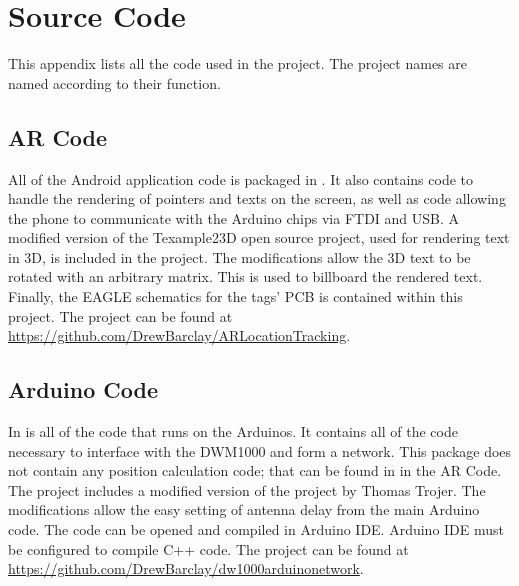 
\chapter{Source Code} %
\label{SourceCode} %

This appendix lists all the code used in the project. The project names are named according to their function.

\section{AR Code}
All of the Android application code is packaged in . It also contains code to handle the rendering
of pointers and texts on the screen, as well as code allowing the phone to communicate
with the Arduino chips via FTDI and USB. A modified version of the Texample23D open source project, used for rendering text in 3D, is included in the project. The modifications allow the 3D text to be rotated with an arbitrary matrix. This is used to billboard the rendered text. Finally, the EAGLE schematics for the tags' PCB is contained within this project. The project can be found at \url{https://github.com/DrewBarclay/ARLocationTracking}.

\section{Arduino Code}
In  is all of the code that runs on the Arduinos. It contains all of the code necessary
to interface with the DWM1000 and form a network. This package does not contain any position calculation code; that can be found in  in the AR Code. The project includes a modified version of the  project by Thomas Trojer. The modifications allow the easy setting of antenna delay from the main Arduino code. The code can be opened and compiled in Arduino IDE. Arduino IDE must be configured to compile C++ code. The project can be found at \url{https://github.com/DrewBarclay/dw1000arduinonetwork}.

